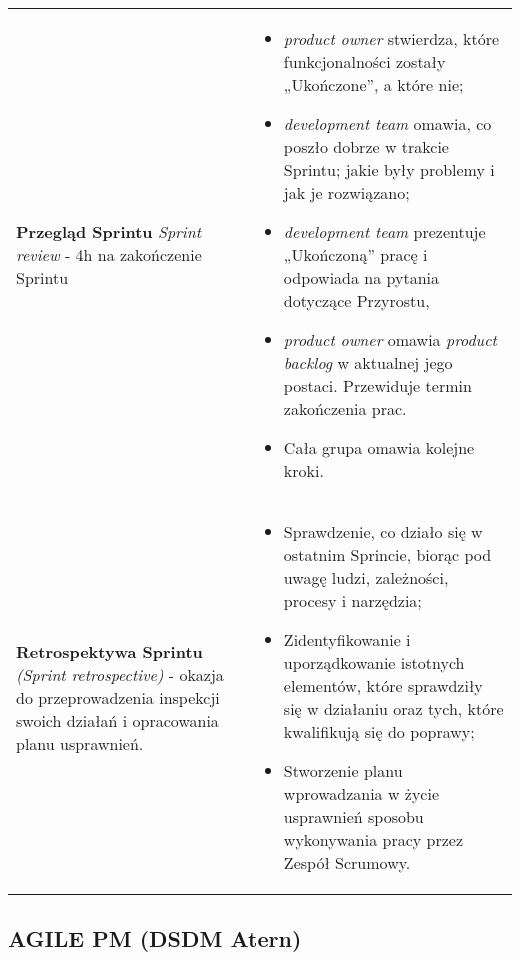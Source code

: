\documentclass[../main.tex]{subfiles}
\begin{document}
\begin{table}[H]
\begin{center}
\begin{tabular}{ p{} p{} }
                \cmidrule(r){1-1}\cmidrule(l){2-2}
                \textbf{Przegląd Sprintu} \textit{{Sprint review}} - 4h na zakończenie Sprintu
                &
                \begin{itemize}
                    \item \textit{product owner} stwierdza, które funkcjonalności zostały
                    „Ukończone”, a które nie;
                    \item \textit{development team} omawia, co poszło dobrze w trakcie
                    Sprintu; jakie były problemy i jak je rozwiązano;
                    \item \textit{development team} prezentuje „Ukończoną” pracę i
                    odpowiada na pytania dotyczące Przyrostu,
                    \item \textit{product owner} omawia \textit{product backlog} w aktualnej
                    jego postaci. Przewiduje termin zakończenia prac.
                    \item Cała grupa omawia kolejne kroki.
                \end{itemize}
                \\

                \cmidrule(r){1-1}\cmidrule(l){2-2}
                \textbf{Retrospektywa Sprintu} \textit{(Sprint retrospective)} - okazja do przeprowadzenia inspekcji
                swoich działań i opracowania planu usprawnień.
                &
                \begin{itemize}
                    \item Sprawdzenie, co działo się w ostatnim Sprincie, biorąc pod
                    uwagę ludzi, zależności, procesy i narzędzia;
                    \item Zidentyfikowanie i uporządkowanie istotnych elementów, które
                    sprawdziły się w działaniu oraz tych, które kwalifikują się do
                    poprawy;
                    \item Stworzenie planu wprowadzania w życie usprawnień sposobu
                    wykonywania pracy przez Zespół Scrumowy.
                \end{itemize}
                \\
            \end{tabular}
        \end{center}
    \end{table}


    \subsection{AGILE PM (DSDM Atern)}
\end{document}
